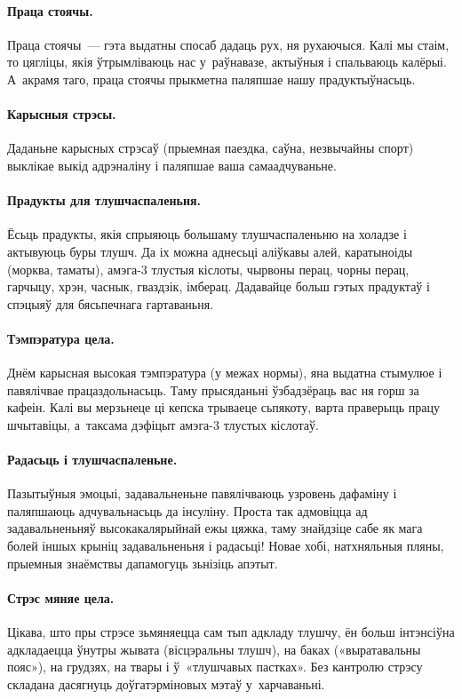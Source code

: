 \paragraph{Праца стоячы.}
Праца стоячы~--- гэта выдатны спосаб дадаць рух, ня рухаючыся. Калі мы стаім, то цягліцы, якія ўтрымліваюць нас у~раўнавазе, актыўныя і спальваюць калёрыі. А~акрамя таго, праца стоячы прыкметна паляпшае нашу прадуктыўнасьць.

\paragraph{Карысныя стрэсы.}
Даданьне карысных стрэсаў (прыемная паездка, саўна, незвычайны спорт) выклікае выкід адрэналіну і паляпшае ваша самаадчуваньне.

\paragraph{Прадукты для тлушчаспаленьня.}
Ёсьць прадукты, якія спрыяюць большаму тлушчаспаленьню на холадзе і актывуюць буры тлушч. Да іх можна аднесьці аліўкавы алей, каратыноіды (морква, таматы), амэга-3 тлустыя кіслоты, чырвоны перац, чорны перац, гарчыцу, хрэн, часнык, гваздзік, імберац. Дадавайце больш гэтых прадуктаў і спэцыяў для бясьпечнага гартаваньня.

\paragraph{Тэмпэратура цела.}
Днём карысная высокая тэмпэратура (у межах нормы), яна выдатна стымулюе і павялічвае працаздольнасьць. Таму прысяданьні ўзбадзёраць вас ня горш за кафеін. Калі вы мерзьнеце ці кепска трываеце сьпякоту, варта праверыць працу шчытавіцы, а~таксама дэфіцыт амэга-3 тлустых кіслотаў.

\paragraph{Радасьць і тлушчаспаленьне.}
Пазытыўныя эмоцыі, задавальненьне павялічваюць узровень дафаміну і паляпшаюць адчувальнасьць да інсуліну. Проста так адмовіцца ад задавальненьняў высокакалярыйнай ежы цяжка, таму знайдзіце сабе як мага болей іншых крыніц задавальненьня і радасьці! Новае хобі, натхняльныя пляны, прыемныя знаёмствы дапамогуць зьнізіць апэтыт.

\paragraph{Стрэс мяняе цела.}
Цікава, што пры стрэсе зьмяняецца сам тып адкладу тлушчу, ён больш інтэнсіўна адкладаецца ўнутры жывата (вісцэральны тлушч), на баках («выратавальны пояс»), на грудзях, на твары і ў~«тлушчавых пастках». Без кантролю стрэсу складана дасягнуць доўгатэрміновых мэтаў у~харчаваньні.


